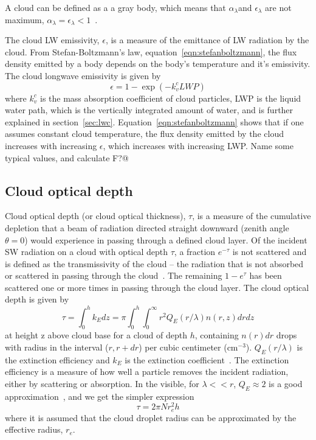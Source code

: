 A cloud can be defined as a a gray body, which means that $\alpha_{\lambda}$and $\epsilon_{\lambda}$ are not maximum, $\alpha_{\lambda}=\epsilon_{\lambda}<1$~\citep{Liou2002}.

The cloud LW emissivity, $\epsilon$, is a measure of the emittance of LW radiation by the cloud. From Stefan-Boltzmann's law, equation~\ref{eqn:stefanboltzmann}, the flux density emitted by a body depends on the body's temperature and it's emissivity. The cloud longwave emissivity is given by~\cite{Liou1992}
\begin{equation}
\epsilon = 1 - \exp(-k_v^c LWP)
\label{eqn:epsilon_lw}
\end{equation}
where $k_v^c$ is the mass absorption coefficient of cloud particles, LWP is the liquid water path, which is the vertically integrated amount of water, and is further explained in section~\ref{sec:lwc}. Equation~\ref{eqn:stefanboltzmann} shows that if one assumes constant cloud temperature, the flux density emitted by the cloud increases with increasing $\epsilon$, which increases with increasing LWP. Name some typical values, and calculate F?@

\subsection{Cloud optical depth}
\label{sec:cloudoptdep}
Cloud optical depth (or cloud optical thickness), $\tau$, is a measure of the cumulative depletion that a beam of radiation directed straight downward (zenith angle $\theta = 0$) would experience in passing through a defined cloud layer. Of the incident SW radiation on a cloud with optical depth $\tau$, a fraction $e^{-\tau}$ is not scattered and is defined as the transmissivity of the cloud -- the radiation that is not absorbed or scattered in passing through the cloud~\citep{Wallace2006}. The remaining $1-e^{\tau}$ has been scattered one or more times in passing through the cloud layer. The cloud optical depth is given by~\citep{Twomey1977}
\begin{equation}
\tau = \int_0^h k_{E}dz = \pi \int_0^h \int_0^{\infty} r^2 Q_E(r/\lambda) n(r,z) dr dz
\end{equation}
at height z above cloud base for a cloud of depth $h$, containing $n(r)dr$ drops with radius in the interval ($r, r + dr$) per cubic centimeter ($\text{cm}^{-3}$). $Q_E(r/\lambda)$ is the extinction efficiency and $k_{E}$ is the extinction coefficient~\citep{Twomey1977}. The extinction efficiency is a measure of how well a particle removes the incident radiation, either by scattering or absorption. In the visible, for $\lambda<<r$, $Q_E\approx 2$ is a good approximation~\citep{Hobbs1993}, and we get the simpler expression
\begin{equation}
\tau = 2\pi N r_e^2 h
\label{eqn:cloudtau1}
\end{equation}
where it is assumed that the cloud droplet radius can be approximated by the effective radius, $r_e$.

